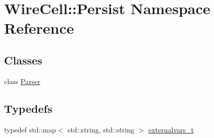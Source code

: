 \hypertarget{namespace_wire_cell_1_1_persist}{}\section{Wire\+Cell\+:\+:Persist Namespace Reference}
\label{namespace_wire_cell_1_1_persist}
\subsection*{Classes}
\begin{DoxyCompactItemize}
\item 
class \hyperlink{class_wire_cell_1_1_persist_1_1_parser}{Parser}
\end{DoxyCompactItemize}
\subsection*{Typedefs}
\begin{DoxyCompactItemize}
\item 
typedef std\+::map$<$ std\+::string, std\+::string $>$ \hyperlink{namespace_wire_cell_1_1_persist_ae031fc57de5b5814ccd700d007bc847b}{externalvars\+\_\+t}
\end{DoxyCompactItemize}

